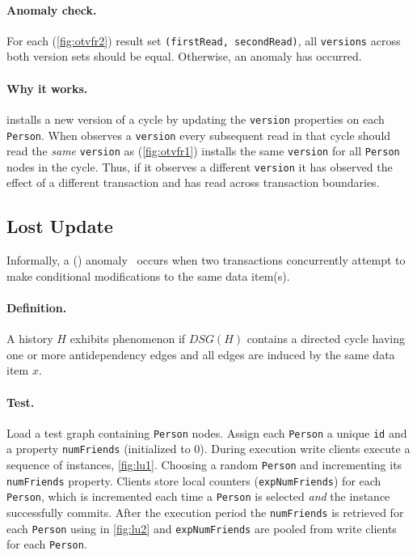 \paragraph{Anomaly check.}
For each   (\autoref{fig:otvfr2}) result set \texttt{(firstRead, secondRead)}, all
\texttt{versions} across both version sets should be equal.
Otherwise, an  anomaly has occurred.

\paragraph{Why it works.}
 installs a new version of a cycle by updating the \texttt{version} properties on each \texttt{Person}.
When  observes a \texttt{version} every subsequent read in that cycle should read the \emph{same} \texttt{version} as  (\autoref{fig:otvfr1}) installs the same \texttt{version} for all \texttt{Person} nodes in the cycle.
Thus, if it observes a different \texttt{version} it has observed the effect of a different transaction and has read across transaction boundaries.


\subsection{Lost Update}
\label{sec:lost-update}

Informally, a  () anomaly~\cite{DBLP:journals/tods/BailisFGHS16} occurs when two transactions concurrently attempt to make conditional modifications to the same data item(s).

\paragraph{Definition.}
A history $H$ exhibits phenomenon  if $\textit{DSG}(H)$ contains a directed cycle having one or more antidependency edges and all edges are induced by the same data item $x$.

\paragraph{Test.}
Load a test graph containing \texttt{Person} nodes.
Assign each \texttt{Person} a unique \texttt{id} and a property \texttt{numFriends} (initialized to 0).
During execution write clients execute a sequence of  instances, \autoref{fig:lu1}.
Choosing a random \texttt{Person} and incrementing its \texttt{numFriends} property.
Clients store local counters (\texttt{expNumFriends}) for each \texttt{Person}, which is incremented each time a \texttt{Person} is selected \emph{and} the  instance successfully commits.
After the execution period the \texttt{numFriends} is retrieved for each \texttt{Person} using  in \autoref{fig:lu2} and \texttt{expNumFriends} are pooled from write clients for each \texttt{Person}.

